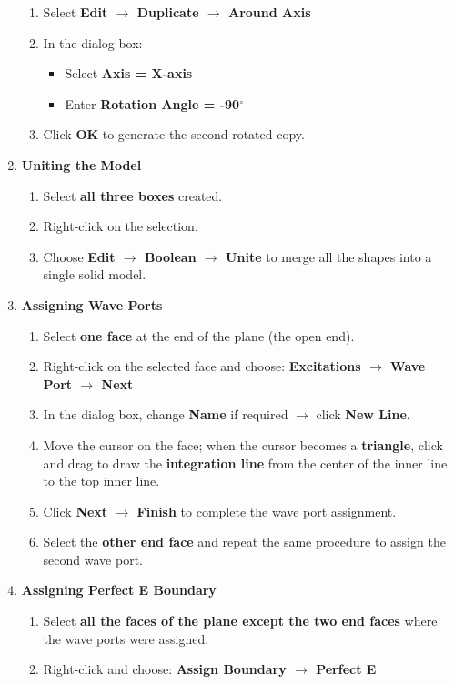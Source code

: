 \documentclass[11pt, a4paper]{article}
\begin{document}
\begin{multicols}{2}
\begin{enumerate}[leftmargin=*, itemsep=15pt]
\begin{enumerate}
		\item Select \textbf{Edit $\rightarrow$ Duplicate $\rightarrow$ Around Axis}
		\item In the dialog box:
		\begin{itemize}
			\item Select \textbf{Axis = X-axis}
			\item Enter \textbf{Rotation Angle = -90$^\circ$}
		\end{itemize}
		\item Click \textbf{OK} to generate the second rotated copy.
	\end{enumerate}
	\item \textbf{Uniting the Model}
		\begin{enumerate}
			\item Select \textbf{all three boxes} created.
			\item Right-click on the selection.
			\item Choose \textbf{Edit $\rightarrow$ Boolean $\rightarrow$ Unite} to merge all the shapes into a single solid model.
		\end{enumerate}
	\item \textbf{Assigning Wave Ports}
		\begin{enumerate}
			\item Select \textbf{one face} at the end of the plane (the open end).
			\item Right-click on the selected face and choose: \textbf{Excitations $\rightarrow$ Wave Port $\rightarrow$ Next}
			\item In the dialog box, change \textbf{Name} if required $\rightarrow$ click \textbf{New Line}.
			\item Move the cursor on the face; when the cursor becomes a \textbf{triangle}, click and drag to draw the \textbf{integration line} from the center of the inner line to the top inner line.
			\item Click \textbf{Next $\rightarrow$ Finish} to complete the wave port assignment.
			\item Select the \textbf{other end face} and repeat the same procedure to assign the second wave port.
		\end{enumerate}
	\item \textbf{Assigning Perfect E Boundary}
		\begin{enumerate}
			\item Select \textbf{ all the faces of the plane except the two end faces} where the wave ports were assigned.
			\item Right-click and choose: \textbf{Assign Boundary $\rightarrow$ Perfect E}

\end{enumerate}
\end{enumerate}
\end{multicols}
\end{document}
